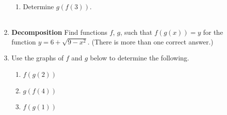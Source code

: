 \begin{enumerate}
\begin{enumerate}
\item Determine $g(f(3))$. \\ \\
\end{enumerate}



\newpage

\item \textbf{Decomposition}  Find functions $f$, $g$, such that $f(g(x))=y$ for the function $y = 6 + \sqrt{9-x^2}$. (There is more than one correct answer.) \\[1in]

\item Use the graphs of $f$ and $g$ below to determine the following.
\begin{enumerate}
\item $f (g(2))$  \\[.5in] 
\item $g(f(4))$  \\[.5in] 
\item $f(g(1))$ \\[.5in] 

\end{enumerate}



\end{enumerate}
